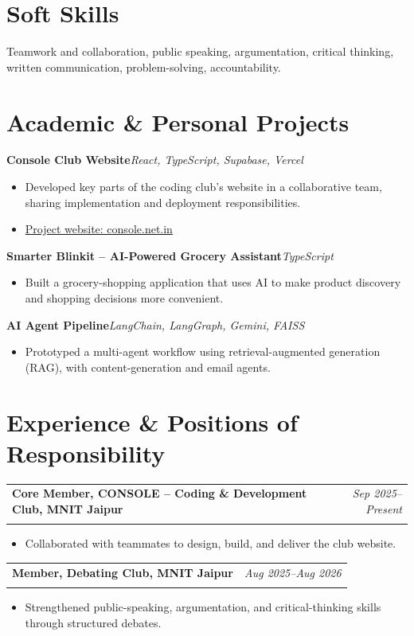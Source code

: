 \documentclass[10pt,a4paper]{article}
\makeatletter
\newcommand{\resumeSubheading}[4]{%
  \begin{tabularx}{\textwidth}{@{}X r@{}}
    \textbf{#1} & \textit{#2}\\
    \textit{#3} & #4
  \end{tabularx}\vspace{-2pt}
}
\newcommand{\projectHeading}[2]{%
  \textbf{#1}\hfill \textit{#2}\\[-2pt]
}
\makeatother
\begin{document}
\section{Soft Skills}
Teamwork and collaboration, public speaking, argumentation, critical thinking, written communication, problem-solving, accountability.

\section{Academic \& Personal Projects}

\projectHeading
  {Console Club Website}
  {React, TypeScript, Supabase, Vercel}
\begin{itemize}
    \item Developed key parts of the coding club's website in a collaborative team, sharing implementation and deployment responsibilities.
    \item \href{https://console.net.in}{Project website: console.net.in}
\end{itemize}

\projectHeading
  {Smarter Blinkit -- AI-Powered Grocery Assistant}
  {TypeScript}
\begin{itemize}
    \item Built a grocery-shopping application that uses AI to make product discovery and shopping decisions more convenient.
\end{itemize}
\projectHeading
  {AI Agent Pipeline}
  {LangChain, LangGraph, Gemini, FAISS}
\begin{itemize}
    \item Prototyped a multi-agent workflow using retrieval-augmented generation (RAG), with content-generation and email agents.
\end{itemize}

\section{Experience \& Positions of Responsibility}

\resumeSubheading
  {Core Member, CONSOLE -- Coding \& Development Club, MNIT Jaipur}
  {Sep 2025--Present}
  {}
  {}
\begin{itemize}
    \item Collaborated with teammates to design, build, and deliver the club website.
\end{itemize}

\resumeSubheading
  {Member, Debating Club, MNIT Jaipur}
  {Aug 2025--Aug 2026}
  {}
  {}
\begin{itemize}
    \item Strengthened public-speaking, argumentation, and critical-thinking skills through structured debates.
\end{itemize}
\end{document}
